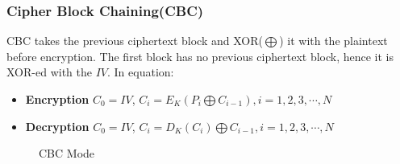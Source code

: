 \documentclass{report}
\begin{document}
			\subsubsection{Cipher Block Chaining(CBC)}
				CBC takes the previous ciphertext block and XOR($\bigoplus$) it with the plaintext before encryption. The first block has no previous ciphertext block, hence it is XOR-ed with the $IV$. In equation:
				\begin{itemize}
					\item \textbf{Encryption} $C_0=IV$, $C_i=E_K(P_i \bigoplus C_{i-1}), i=1,2,3,\cdots,N$
					\item \textbf{Decryption} $C_0=IV$, $C_i=D_K(C_i) \bigoplus C_{i-1}, i=1,2,3,\cdots,N$
				\end{itemize}
				\begin{figure}[h!]
					\centering
					 \label{fig-CBC-ENC}
					\qquad
					 \label{fig-CBC-DEC}
					\caption{CBC Mode}
					\label{fig-CBC}
				\end{figure}
			
\end{document}
